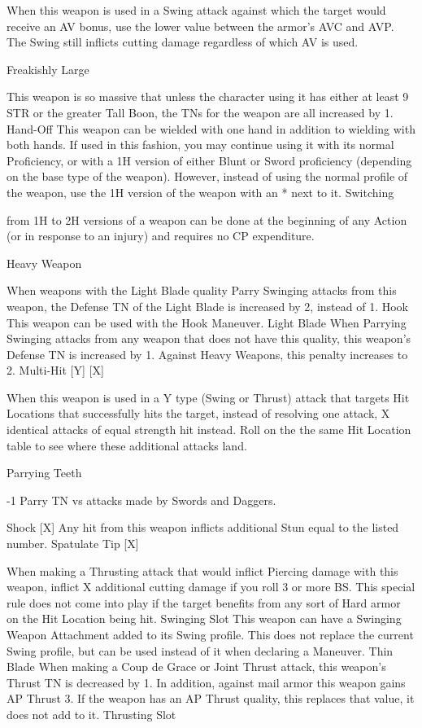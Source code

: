 \documentclass[oneside,11pt,english]{book}
\begin{document}
When this weapon is used in a Swing attack against which the target would receive an AV bonus, 
use the lower value between the armor’s AVC and AVP. The Swing still inflicts cutting damage 
regardless of which AV is used. 

Freakishly 
Large 

This weapon is so massive that unless the character using it has either at least 9 STR or the 
greater Tall Boon, the TNs for the weapon are all increased by 1. 
Hand-Off This weapon can be wielded with one hand in addition to wielding with both hands. If used in this 
fashion, you may continue using it with its normal Proficiency, or with a 1H version of either Blunt 
or Sword proficiency (depending on the base type of the weapon). However, instead of using the 
normal profile of the weapon, use the 1H version of the weapon with an * next to it. Switching 


from 1H to 2H versions of a weapon can be done at the beginning of any Action (or in response to 
an injury) and requires no CP expenditure. 

Heavy 
Weapon 

When weapons with the Light Blade quality Parry Swinging attacks from this weapon, the Defense 
TN of the Light Blade is increased by 2, instead of 1. 
Hook This weapon can be used with the Hook Maneuver. 
Light Blade When Parrying Swinging attacks from any weapon that does not have this quality, this weapon’s 
Defense TN is increased by 1. Against Heavy Weapons, this penalty increases to 2. 
Multi-Hit [Y] 
[X] 

When this weapon is used in a Y type (Swing or Thrust) attack that targets Hit Locations that 
successfully hits the target, instead of resolving one attack, X identical attacks of equal strength hit 
instead. Roll on the the same Hit Location table to see where these additional attacks land. 

Parrying 
Teeth 

-1 Parry TN vs attacks made by Swords and Daggers. 

Shock [X] Any hit from this weapon inflicts additional Stun equal to the listed number. 
Spatulate Tip 
[X] 

When making a Thrusting attack that would inflict Piercing damage with this weapon, inflict X 
additional cutting damage if you roll 3 or more BS. This special rule does not come into play if the 
target benefits from any sort of Hard armor on the Hit Location being hit. 
Swinging Slot This weapon can have a Swinging Weapon Attachment added to its Swing profile. This does not 
replace the current Swing profile, but can be used instead of it when declaring a Maneuver. 
Thin Blade When making a Coup de Grace or Joint Thrust attack, this weapon’s Thrust TN is decreased by 1. 
In addition, against mail armor this weapon gains AP Thrust 3. If the weapon has an AP Thrust 
quality, this replaces that value, it does not add to it. 
Thrusting 
Slot 
\end{document}

